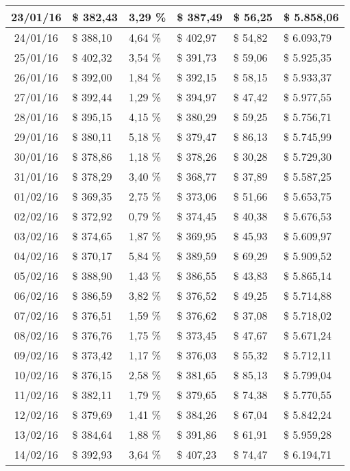 \begin{small}
\begin{longtable}{|c|l|l|l|l|l|}
23/01/16 & \$ 382,43 & 3,29 \% & \$ 387,49 & \$ 56,25 & \$ 5.858,06 \\ \hline
24/01/16 & \$ 388,10 & 4,64 \% & \$ 402,97 & \$ 54,82 & \$ 6.093,79 \\ \hline
25/01/16 & \$ 402,32 & 3,54 \% & \$ 391,73 & \$ 59,06 & \$ 5.925,35 \\ \hline
26/01/16 & \$ 392,00 & 1,84 \% & \$ 392,15 & \$ 58,15 & \$ 5.933,37 \\ \hline
27/01/16 & \$ 392,44 & 1,29 \% & \$ 394,97 & \$ 47,42 & \$ 5.977,55 \\ \hline
28/01/16 & \$ 395,15 & 4,15 \% & \$ 380,29 & \$ 59,25 & \$ 5.756,71 \\ \hline
29/01/16 & \$ 380,11 & 5,18 \% & \$ 379,47 & \$ 86,13 & \$ 5.745,99 \\ \hline
30/01/16 & \$ 378,86 & 1,18 \% & \$ 378,26 & \$ 30,28 & \$ 5.729,30 \\ \hline
31/01/16 & \$ 378,29 & 3,40 \% & \$ 368,77 & \$ 37,89 & \$ 5.587,25 \\ \hline
01/02/16 & \$ 369,35 & 2,75 \% & \$ 373,06 & \$ 51,66 & \$ 5.653,75 \\ \hline
02/02/16 & \$ 372,92 & 0,79 \% & \$ 374,45 & \$ 40,38 & \$ 5.676,53 \\ \hline
03/02/16 & \$ 374,65 & 1,87 \% & \$ 369,95 & \$ 45,93 & \$ 5.609,97 \\ \hline
04/02/16 & \$ 370,17 & 5,84 \% & \$ 389,59 & \$ 69,29 & \$ 5.909,52 \\ \hline
05/02/16 & \$ 388,90 & 1,43 \% & \$ 386,55 & \$ 43,83 & \$ 5.865,14 \\ \hline
06/02/16 & \$ 386,59 & 3,82 \% & \$ 376,52 & \$ 49,25 & \$ 5.714,88 \\ \hline
07/02/16 & \$ 376,51 & 1,59 \% & \$ 376,62 & \$ 37,08 & \$ 5.718,02 \\ \hline
08/02/16 & \$ 376,76 & 1,75 \% & \$ 373,45 & \$ 47,67 & \$ 5.671,24 \\ \hline
09/02/16 & \$ 373,42 & 1,17 \% & \$ 376,03 & \$ 55,32 & \$ 5.712,11 \\ \hline
10/02/16 & \$ 376,15 & 2,58 \% & \$ 381,65 & \$ 85,13 & \$ 5.799,04 \\ \hline
11/02/16 & \$ 382,11 & 1,79 \% & \$ 379,65 & \$ 74,38 & \$ 5.770,55 \\ \hline
12/02/16 & \$ 379,69 & 1,41 \% & \$ 384,26 & \$ 67,04 & \$ 5.842,24 \\ \hline
13/02/16 & \$ 384,64 & 1,88 \% & \$ 391,86 & \$ 61,91 & \$ 5.959,28 \\ \hline
14/02/16 & \$ 392,93 & 3,64 \% & \$ 407,23 & \$ 74,47 & \$ 6.194,71 \\ \hline

\end{longtable}
\end{small}
